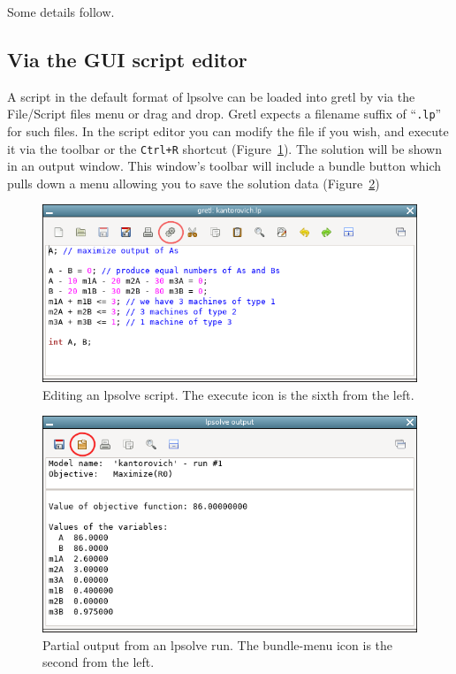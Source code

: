 \documentclass{article}
\begin{document}
Some details follow.

\subsection{Via the GUI script editor}

A script in the default format of \textsf{lpsolve} can be loaded into
gretl by via the \textsf{File/Script files} menu or drag and drop.
Gretl expects a filename suffix of ``\texttt{.lp}'' for such files.
In the script editor you can modify the file if you wish, and execute
it via the toolbar or the \texttt{Ctrl+R} shortcut
(Figure~\ref{fig:kantor1}). The solution will be shown in an output
window. This window's toolbar will include a bundle button which pulls
down a menu allowing you to save the solution data
(Figure~\ref{fig:kantor2})

\begin{figure}[p]
  \centering
  \includegraphics[scale=0.7]{figures/kantor-edit}
  \caption{Editing an \textsf{lpsolve} script. The execute icon is the
    sixth from the left.}
  \label{fig:kantor1}
\end{figure}

\begin{figure}[p]
  \centering
  \includegraphics[scale=0.7]{figures/kantor-run}
  \caption{Partial output from an \textsf{lpsolve} run. The
    bundle-menu icon is the second from the left.}
  \label{fig:kantor2}
\end{figure}
\end{document}
